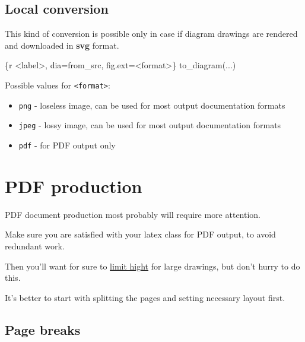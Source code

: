 \documentclass[
  12pt,
  a4paper,
  12pt,
  oneside,
  openany]{book}
\newenvironment{Shaded}{\begin{snugshade}}{\end{snugshade}}
\newcommand{\DataTypeTok}[1]{\textcolor[rgb]{0.27,0.27,0.27}{#1}}
\newcommand{\StringTok}[1]{\textcolor[rgb]{0.5,0.5,0.5}{#1}}
\providecommand{\tightlist}{%
  \setlength{\itemsep}{0pt}\setlength{\parskip}{0pt}}
\begin{document}
\hypertarget{usage-format-conversion}{%
\subsection{Local conversion}\label{usage-format-conversion}}

This kind of conversion is possible only in case if diagram drawings are rendered and downloaded in \textbf{svg} format.

\begin{Shaded}
\begin{Highlighting}[]
\StringTok{\textasciigrave{}\textasciigrave{}\textasciigrave{}}\DataTypeTok{\{r \textless{}label\textgreater{}, dia=\textquotesingle{}from\_src\textquotesingle{}, fig.ext=\textquotesingle{}\textless{}format\textgreater{}\textquotesingle{}\}}
\DataTypeTok{  to\_diagram(...)}
\StringTok{\textasciigrave{}\textasciigrave{}\textasciigrave{}}
\end{Highlighting}
\end{Shaded}

Possible values for \texttt{\textless{}format\textgreater{}}:

\begin{itemize}
\tightlist
\item
  \texttt{png} - loseless image, can be used for most output documentation formats
\item
  \texttt{jpeg} - lossy image, can be used for most output documentation formats
\item
  \texttt{pdf} - for PDF output only
\end{itemize}

\hypertarget{usage-pdf}{%
\section{PDF production}\label{usage-pdf}}

PDF document production most probably will require more attention.

Make sure you are satisfied with your latex class for PDF output, to avoid redundant work.

Then you'll want for sure to \protect\hyperlink{usage-customize-rChunks-height}{limit hight} for large drawings, but don't hurry to do this.

It's better to start with splitting the pages and setting necessary layout first.

\hypertarget{usage-pdf-pageBreak}{%
\subsection{Page breaks}\label{usage-pdf-pageBreak}}
\end{document}
